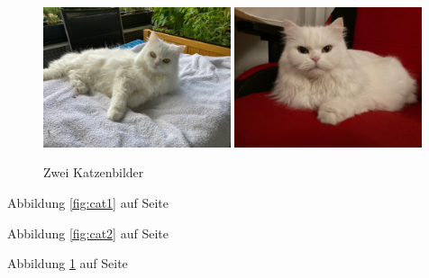 \documentclass[a4paper, ngerman, 12pt,parskip=half]{scrreprt}
\begin{document}
\blindtext[10]

\begin{figure}
	\centering
	{\includegraphics[width=0.49\textwidth]{Bilder/Katze1}}
	{\includegraphics[width=0.49\textwidth]{Bilder/Katze2}}
	\caption{Zwei Katzenbilder}\label{fig:katzenbilder}
\end{figure}

Abbildung \ref{fig:cat1} auf Seite \pageref{fig:katzenbilder}

Abbildung \ref{fig:cat2} auf Seite \pageref{fig:katzenbilder}

Abbildung \ref{fig:katzenbilder} auf Seite \pageref{fig:katzenbilder}

\blindtext[2]
	
\end{document}
